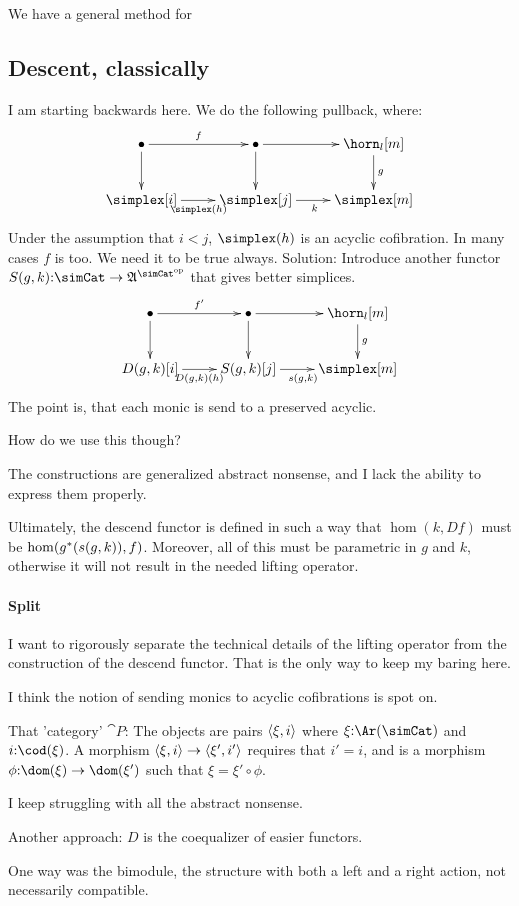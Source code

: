 \documentclass[csh.tex]{subfiles}
\begin{document}
We have a general method for 


\subsection{Descent, classically}
I am starting backwards here. We do the following pullback, where:
\[\xymatrix{
\bullet\ar[r]^f\ar[d] &\bullet\ar[r]\ar[d] & \horn_l[m]\ar[d]^g\\
\simplex[i]\ar[r]_{\simplex(h)} & \simplex[j]\ar[r]_k & \simplex[m]
}\]
Under the assumption that $i<j$, $\simplex(h)$ is an acyclic cofibration. In many cases $f$ is too. We need it to be true always. Solution:
Introduce another functor $S(g,k)\of\simCat \to \ambient\s$ that gives better simplices.
\[\xymatrix{
\bullet\ar[r]^{f'}\ar[d] &\bullet\ar[r]\ar[d] & \horn_l[m]\ar[d]^g\\
D(g,k)[i]\ar[r]_{D(g,k)(h)} & S(g,k)[j]\ar[r]_{s(g,k)} & \simplex[m]
}\]
The point is, that each monic is send to a preserved acyclic.

How do we use this though?

The constructions are generalized abstract nonsense, and I lack the ability to express them properly. 

Ultimately, the descend functor is defined in such a way that $\hom(k, Df)$ must be $\hom(g^*(s(g,k)),f)$. Moreover, all of this must be parametric in $g$ and $k$, otherwise it will not result in the needed lifting operator.

\paragraph{Split}
I want to rigorously separate the technical details of the lifting operator from the construction of the descend functor. That is the only way to keep my baring here.

I think the notion of sending monics to acyclic cofibrations is spot on.

That 'category' $\cat P$:
The objects are pairs $\left\langle \xi,i \right\rangle$ where $\xi\of \Ar(\simCat)$ and $i\of\cod(\xi)$.
A morphism $\left\langle \xi,i \right\rangle\to \left\langle \xi',i' \right\rangle$ requires that $i'=i$, and is a morphism $\phi\of \dom(\xi)\to\dom(\xi')$ such that $\xi = \xi'\circ \phi$.

I keep struggling with all the abstract nonsense.

Another approach: $D$ is the coequalizer of easier functors. 

One way was the bimodule, the structure with both a left and a right action, not necessarily compatible.
\end{document}
